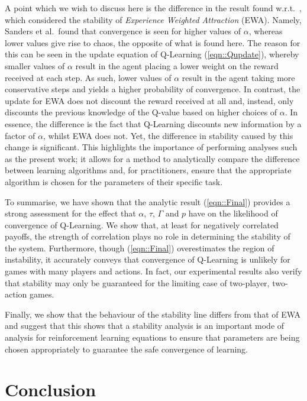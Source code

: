 \documentclass[sigconf,anonymous]{aamas}
\begin{document}
A point which we wish to discuss here is the difference in the result found w.r.t.~\cite{Sanders2018}, which considered the stability of \textit{Experience Weighted Attraction} (EWA). Namely, Sanders et al.~found that convergence is seen for higher values of $\alpha$, whereas lower values give rise to chaos, the opposite of what is found here. The reason for this can be seen in the update equation of Q-Learning (\ref{eqn::Qupdate}), whereby
smaller values of $\alpha$ result in the agent placing a lower weight on the reward received at each step. As such, lower values of $\alpha$ result in the agent taking more conservative steps and yields a higher probability of convergence. In contrast, the update for EWA does not discount the reward received at all and, instead, only discounts the previous knowledge of the Q-value based on higher choices of $\alpha$. In essence, the difference is the fact that Q-Learning discounts new information by a factor of $\alpha$, whilst EWA does not. Yet, the difference in stability caused by this change is significant. This highlights the importance of performing analyses such as the present work; it allows for a method to analytically compare the difference between learning algorithms and, for practitioners, ensure that the appropriate algorithm is chosen for the parameters of their specific task.

To summarise, we have shown that the analytic result (\ref{eqn::Final}) provides a strong assessment for the effect that $\alpha$, $\tau$, $\Gamma$ and $p$ have on the likelihood of convergence of Q-Learning. We show that, at least for negatively correlated payoffs, the strength of correlation plays no role in determining the stability of the system. Furthermore, though (\ref{eqn::Final}) overestimates the region of instability, it accurately conveys that convergence of Q-Learning is unlikely for games with many players and actions. In fact, our experimental results also verify that stability may only be guaranteed for the limiting case of two-player, two-action games.

Finally, we show that the behaviour of the stability line differs from that of EWA and suggest that this shows that a stability analysis is an important mode of analysis for reinforcement learning equations to ensure that parameters are being chosen appropriately to guarantee the safe convergence of learning. 


\section{Conclusion}
\end{document}
